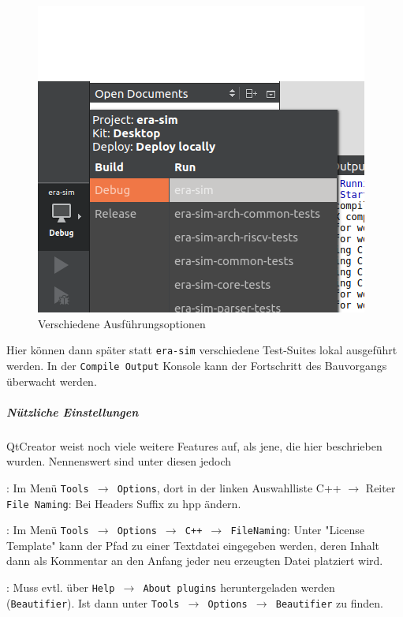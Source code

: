\begin{figure}[h!]
	\centering
	\includegraphics[trim={1.4cm 0cm 0.5cm 2.5cm}, clip, scale=0.7]{images/setup-qtcreator-change-buildrun-flavor.png}
	\caption{Verschiedene Ausführungsoptionen}
\end{figure}

Hier können dann später statt \texttt{era-sim} verschiedene Test-Suites lokal
ausgeführt werden. In der \texttt{Compile Output} Konsole kann der Fortschritt
des Bauvorgangs überwacht werden.

\subparagraph{Nützliche Einstellungen}

QtCreator weist noch viele weitere Features auf, als jene, die hier beschrieben
wurden. Nennenswert sind unter diesen jedoch

\begin{itemize}
  : Im Menü \texttt{Tools $\rightarrow$ Options}, dort in der linken Auswahlliste C++ $\rightarrow$
  Reiter \texttt{File Naming}: Bei Headers Suffix zu hpp ändern.

  : Im Menü \texttt{Tools $\rightarrow$
  Options $\rightarrow$ C++ $\rightarrow$ FileNaming}: Unter "License Template"
  kann der Pfad zu einer Textdatei eingegeben werden, deren Inhalt dann als
  Kommentar an den Anfang jeder neu erzeugten Datei platziert wird.

  : Muss evtl. über \texttt{Help
  $\rightarrow$ About plugins} heruntergeladen werden (\texttt{Beautifier}). Ist
  dann unter \texttt{Tools $\rightarrow$ Options $\rightarrow$ Beautifier} zu
  finden.
\end{itemize}
